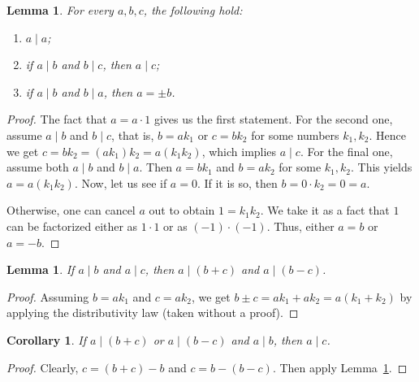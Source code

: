 \documentclass[12pt,notitlepage]{article}
\theoremstyle{plain}
\newtheorem{lemma}[thm]{Lemma}
\newtheorem{corr}[thm]{Corollary}
\theoremstyle{definition}
\theoremstyle{plain}
\newcommand{\1}{\mathbf{1}}
\newcommand{\0}{\mathbf{0}}
\newcommand{\dvd}{\mathop{\mid}}
\begin{document}
\begin{lemma}\label{L4:l1}
For every $a,b,c$, the following hold:
\begin{enumerate}
\item $a \dvd a$;
\item if $a \dvd b$ and $b \dvd c$, then $a \dvd c$;
\item if $a \dvd b$ and $b \dvd a$, then $a = \pm b$.
\end{enumerate}
\end{lemma}
\begin{proof}
The fact that $a = a \cdot 1$ gives us the first statement. For the second one, assume $a \dvd b$ and $b \dvd c$, that is, $b = ak_1$ or $c = bk_2$ for some numbers $k_1, k_2$. Hence we get $c = bk_2 = (a k_1) k_2 = a (k_1 k_2)$, which implies $a \dvd c$. For the final one, assume both $a \dvd b$ and $b \dvd a$. Then $a = b k_1$ and $b = a k_2$ for some $k_1, k_2$. This yields $a = a (k_1 k_2)$. Now, let us see if $a = 0$. If it is so, then $b = 0 \cdot k_2 = 0 = a$.

Otherwise, one can cancel $a$ out to obtain $1 = k_1 k_2$. We take it as a fact that $1$ can be factorized either as $1\cdot 1$ or as $(-1) \cdot (-1)$. Thus, either $a = b$ or $a = -b$.
\end{proof}

\begin{lemma}\label{L4:l2}
If $a \dvd b$ and $a \dvd c$, then $a \dvd (b + c)$ and $a \dvd (b - c)$.
\end{lemma}
\begin{proof}
Assuming $b = ak_1$ and $c = ak_2$, we get $b \pm c = ak_1 + ak_2 = a(k_1 + k_2)$ by applying the distributivity law (taken without a proof).
\end{proof}
\begin{corr}\label{L4:c3}
If $a \dvd (b + c)$ or $a \dvd (b - c) $ and $a \dvd b$, then $a \dvd c$.
\end{corr}
\begin{proof}
Clearly, $c = (b + c) - b$ and $c = b - (b - c)$. Then apply Lemma~\ref{L4:l2}.
\end{proof}
\end{document}
